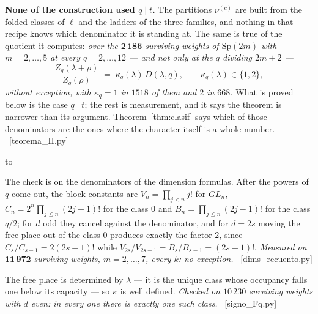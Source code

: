 \documentclass[11pt,a4paper]{article}
\theoremstyle{definition}
\newcommand{\Sp}{\mathrm{Sp}}
\newcommand{\ver}[1]{\unskip\penalty0\ \textcolor{azul}{\small\textsf{[#1]}}}
\newenvironment{keybox}
  {\par\vspace{9pt}\begin{lrbox}{\fichabox}%
   \begin{minipage}{0.90\textwidth}\vspace{7pt}\setlength{\parskip}{3pt}}
  {\vspace{7pt}\end{minipage}\end{lrbox}%
   \par\noindent\hbox to \textwidth{\hfill
   \textcolor{azul}{\rule[-\dp\fichabox]{3.2pt}{\dimexpr\ht\fichabox+\dp\fichabox\relax}}%
   \colorbox{fondoficha}{\usebox{\fichabox}}\hfill}%
   \par\vspace{9pt}}
\begin{document}
\begin{keybox}
\textbf{None of the construction used $q\mid t$.} The partitions $\nu^{(c)}$ are built from the
folded classes of $\ell$ and the ladders of the three families, and nothing in that recipe knows
which denominator it is standing at. The same is true of the quotient it computes:
\emph{over the $\mathbf{2\,186}$ surviving weights of $\Sp(2m)$ with $m=2,\dots,5$ at every
$q=2,\dots,12$ --- and not only at the $q$ dividing $2m+2$ ---}
\[
\frac{Z_q(\lambda+\rho)}{Z_q(\rho)}\;=\;\kappa_q(\lambda)\,D(\lambda,q),
\qquad \kappa_q(\lambda)\in\{1,2\},
\]
\emph{without exception, with $\kappa_q=1$ in $1518$ of them and $2$ in $668$.} What is proved below
is the case $q\mid t$; the rest is measurement, and it says the theorem is narrower than its
argument. Theorem~\ref{thm:clasif} says which of those denominators are the ones where the character
itself is a whole number. \ver{teorema\_II.py}
\end{keybox}

\noindent The check is on the denominators of the dimension formulas. After the powers of $q$ come
out, the block constants are $V_n=\prod_{j<n}j!$ for $GL_n$, $C_n=2^n\prod_{j\le n}(2j-1)!$ for the
class $0$ and $B_n=\prod_{j\le n}(2j-1)!$ for the class $q/2$; for $d$ odd they cancel against the
denominator, and for $d=2s$ moving the free place out of the class $0$ produces exactly the factor
$2$, since $C_s/C_{s-1}=2(2s-1)!$ while $V_{2s}/V_{2s-1}=B_s/B_{s-1}=(2s-1)!$. \emph{Measured on
$\mathbf{11\,972}$ surviving weights, $m=2,\dots,7$, every $k$: no exception.}
\ver{dims\_recuento.py}

\noindent The free place is determined by $\lambda$ --- it is the unique class whose occupancy falls
one below its capacity --- so $\kappa$ is well defined. \emph{Checked on $10\,230$ surviving weights
with $d$ even: in every one there is exactly one such class.} \ver{signo\_Fq.py}
\end{document}
